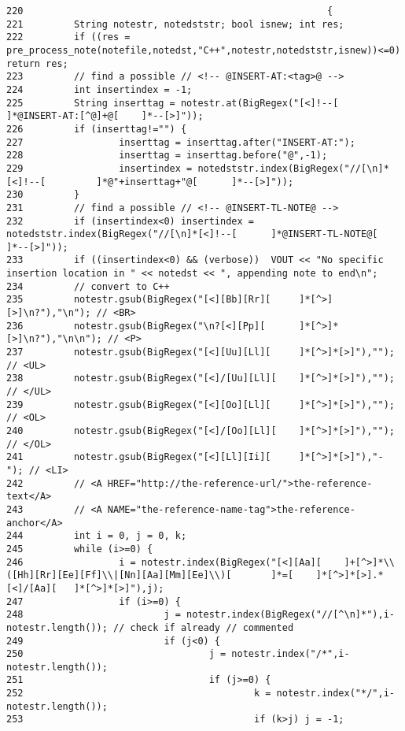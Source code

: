 \footnotesize\begin{verbatim}220                                                      {
221         String notestr, notedststr; bool isnew; int res;
222         if ((res = pre_process_note(notefile,notedst,"C++",notestr,notedststr,isnew))<=0) return res;
223         // find a possible // <!-- @INSERT-AT:<tag>@ -->
224         int insertindex = -1;
225         String inserttag = notestr.at(BigRegex("[<]!--[         ]*@INSERT-AT:[^@]+@[    ]*--[>]"));
226         if (inserttag!="") {
227                 inserttag = inserttag.after("INSERT-AT:");
228                 inserttag = inserttag.before("@",-1);
229                 insertindex = notedststr.index(BigRegex("//[\n]*[<]!--[         ]*@"+inserttag+"@[      ]*--[>]"));
230         }
231         // find a possible // <!-- @INSERT-TL-NOTE@ -->
232         if (insertindex<0) insertindex = notedststr.index(BigRegex("//[\n]*[<]!--[      ]*@INSERT-TL-NOTE@[     ]*--[>]"));
233         if ((insertindex<0) && (verbose))  VOUT << "No specific insertion location in " << notedst << ", appending note to end\n";
234         // convert to C++
235         notestr.gsub(BigRegex("[<][Bb][Rr][     ]*[^>][>]\n?"),"\n"); // <BR>
236         notestr.gsub(BigRegex("\n?[<][Pp][      ]*[^>]*[>]\n?"),"\n\n"); // <P>
237         notestr.gsub(BigRegex("[<][Uu][Ll][     ]*[^>]*[>]"),""); // <UL>
238         notestr.gsub(BigRegex("[<]/[Uu][Ll][    ]*[^>]*[>]"),""); // </UL>
239         notestr.gsub(BigRegex("[<][Oo][Ll][     ]*[^>]*[>]"),""); // <OL>
240         notestr.gsub(BigRegex("[<]/[Oo][Ll][    ]*[^>]*[>]"),""); // </OL>
241         notestr.gsub(BigRegex("[<][Ll][Ii][     ]*[^>]*[>]"),"- "); // <LI>
242         // <A HREF="http://the-reference-url/">the-reference-text</A>
243         // <A NAME="the-reference-name-tag">the-reference-anchor</A>
244         int i = 0, j = 0, k;
245         while (i>=0) {
246                 i = notestr.index(BigRegex("[<][Aa][    ]+[^>]*\\([Hh][Rr][Ee][Ff]\\|[Nn][Aa][Mm][Ee]\\)[       ]*=[    ]*[^>]*[>].*[<]/[Aa][   ]*[^>]*[>]"),j);
247                 if (i>=0) {
248                         j = notestr.index(BigRegex("//[^\n]*"),i-notestr.length()); // check if already // commented
249                         if (j<0) {
250                                 j = notestr.index("/*",i-notestr.length());
251                                 if (j>=0) {
252                                         k = notestr.index("*/",i-notestr.length());
253                                         if (k>j) j = -1;

\end{verbatim}
